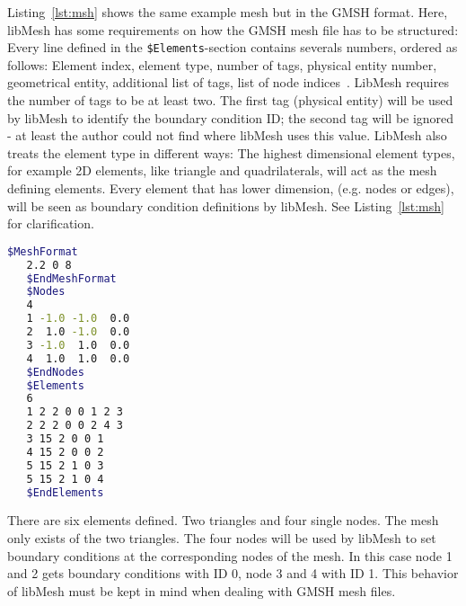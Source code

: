    Listing~\ref{lst:msh} shows the same example mesh but in the GMSH format. Here, libMesh has some requirements on how the GMSH mesh file has to be structured: Every line defined in the \texttt{\$Elements}-section contains severals numbers, ordered as follows: Element index, element type, number of tags, physical entity number, geometrical entity, additional list of tags, list of node indices~\cite{gmsh-manual}. LibMesh requires the number of tags to be at least two. The first tag (physical entity) will be used by libMesh to identify the boundary condition ID; the second tag will be ignored - at least the author could not find where libMesh uses this value. LibMesh also treats the element type in different ways: The highest dimensional element types, for example 2D elements, like triangle and quadrilaterals, will act as the mesh defining elements. Every element that has lower dimension, (e.g. nodes or edges), will be seen as boundary condition definitions by libMesh. See Listing~\ref{lst:msh} for clarification.
   \begin{lstlisting}[caption=Example GMSH mesh file,label=lst:msh,language=bash,keepspaces=true]
   $MeshFormat
   2.2 0 8
   $EndMeshFormat
   $Nodes
   4
   1 -1.0 -1.0  0.0
   2  1.0 -1.0  0.0
   3 -1.0  1.0  0.0
   4  1.0  1.0  0.0
   $EndNodes
   $Elements
   6
   1 2 2 0 0 1 2 3
   2 2 2 0 0 2 4 3
   3 15 2 0 0 1
   4 15 2 0 0 2
   5 15 2 1 0 3
   5 15 2 1 0 4
   $EndElements
   \end{lstlisting}
   There are six elements defined. Two triangles and four single nodes. The mesh only exists of the two triangles. The four nodes will be used by libMesh to set boundary conditions at the corresponding nodes of the mesh. In this case node 1 and 2 gets boundary conditions with ID 0, node 3 and 4 with ID 1. This behavior of libMesh must be kept in mind when dealing with GMSH mesh files.
   
